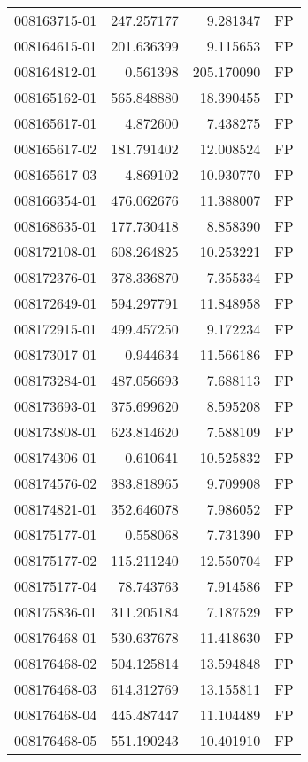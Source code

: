 \begin{tabular}{lrrl}
008163715-01 &  247.257177 &     9.281347 &   FP \\
008164615-01 &  201.636399 &     9.115653 &   FP \\
008164812-01 &    0.561398 &   205.170090 &   FP \\
008165162-01 &  565.848880 &    18.390455 &   FP \\
008165617-01 &    4.872600 &     7.438275 &   FP \\
008165617-02 &  181.791402 &    12.008524 &   FP \\
008165617-03 &    4.869102 &    10.930770 &   FP \\
008166354-01 &  476.062676 &    11.388007 &   FP \\
008168635-01 &  177.730418 &     8.858390 &   FP \\
008172108-01 &  608.264825 &    10.253221 &   FP \\
008172376-01 &  378.336870 &     7.355334 &   FP \\
008172649-01 &  594.297791 &    11.848958 &   FP \\
008172915-01 &  499.457250 &     9.172234 &   FP \\
008173017-01 &    0.944634 &    11.566186 &   FP \\
008173284-01 &  487.056693 &     7.688113 &   FP \\
008173693-01 &  375.699620 &     8.595208 &   FP \\
008173808-01 &  623.814620 &     7.588109 &   FP \\
008174306-01 &    0.610641 &    10.525832 &   FP \\
008174576-02 &  383.818965 &     9.709908 &   FP \\
008174821-01 &  352.646078 &     7.986052 &   FP \\
008175177-01 &    0.558068 &     7.731390 &   FP \\
008175177-02 &  115.211240 &    12.550704 &   FP \\
008175177-04 &   78.743763 &     7.914586 &   FP \\
008175836-01 &  311.205184 &     7.187529 &   FP \\
008176468-01 &  530.637678 &    11.418630 &   FP \\
008176468-02 &  504.125814 &    13.594848 &   FP \\
008176468-03 &  614.312769 &    13.155811 &   FP \\
008176468-04 &  445.487447 &    11.104489 &   FP \\
008176468-05 &  551.190243 &    10.401910 &   FP \\

\end{tabular}
